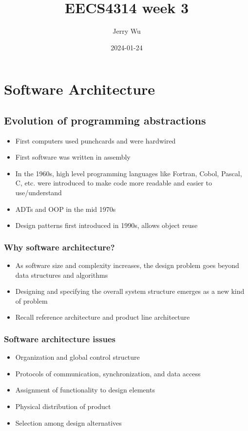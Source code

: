\documentclass[12pt]{book}
\title{EECS4314 week 3}
\author{Jerry Wu}
\date{2024-01-24}
\begin{document}
\maketitle
\tableofcontents

\chapter{Software Architecture}

\section{Evolution of programming abstractions}

\begin{itemize}
    \item First computers used punchcards and were hardwired
    \item First software was written in assembly
    \item In the 1960s, high level programming languages like Fortran, Cobol, Pascal, C, etc. were introduced to make code more readable and easier to use/understand
    \item ADTs and OOP in the mid 1970s
    \item Design patterns first introduced in 1990s, allows object reuse
\end{itemize}

\subsection{Why software architecture?}
\begin{itemize}
    \item As software size and complexity increases, the design problem goes beyond data structures and algorithms
    \item Designing and specifying the overall system structure emerges as a new kind of problem
    \item Recall reference architecture and product line architecture
\end{itemize}

\subsection{Software architecture issues}
\begin{itemize}
    \item Organization and global control structure
    \item Protocols of communication, synchronization, and data access
    \item Assignment of functionality to design elements
    \item Physical distribution of product
    \item Selection among design alternatives
\end{itemize}
\end{document}
